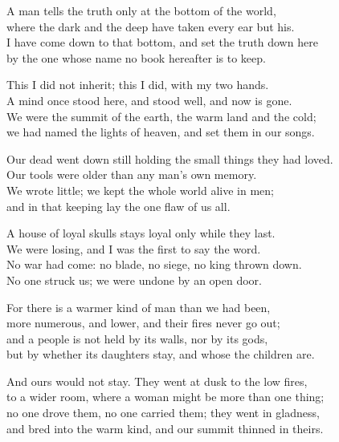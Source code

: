 
\begin{founder}
A man tells the truth only at the bottom of the world,\\
where the dark and the deep have taken every ear but his.\\
I have come down to that bottom, and set the truth down here\\
by the one whose name no book hereafter is to keep.\\
\medskip

This I did not inherit; this I did, with my two hands.\\
A mind once stood here, and stood well, and now is gone.\\
We were the summit of the earth, the warm land and the cold;\\
we had named the lights of heaven, and set them in our songs.\\
\medskip

Our dead went down still holding the small things they had loved.\\
Our tools were older than any man's own memory.\\
We wrote little; we kept the whole world alive in men;\\
and in that keeping lay the one flaw of us all.\\
\medskip

A house of loyal skulls stays loyal only while they last.\\
We were losing, and I was the first to say the word.\\
No war had come: no blade, no siege, no king thrown down.\\
No one struck us; we were undone by an open door.\\
\medskip

For there is a warmer kind of man than we had been,\\
more numerous, and lower, and their fires never go out;\\
and a people is not held by its walls, nor by its gods,\\
but by whether its daughters stay, and whose the children are.\\
\medskip

And ours would not stay. They went at dusk to the low fires,\\
to a wider room, where a woman might be more than one thing;\\
no one drove them, no one carried them; they went in gladness,\\
and bred into the warm kind, and our summit thinned in theirs.\\
\medskip


\end{founder}
